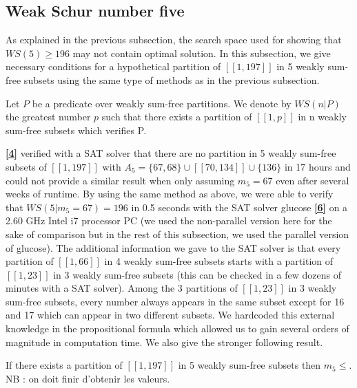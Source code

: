 \subsection{Weak Schur number five}
As explained in the previous subsection, the search space used for showing that \(WS(5) \geqslant 196\) may not contain
optimal solution. In this subsection,
we give necessary conditions for a hypothetical partition of \([\![1,197]\!]\) in 5 weakly sum-free subsets using the
same type of methods as in the
previous subsection.

\begin{notation}
Let \(P\) be a predicate over weakly sum-free partitions. We denote by \(WS(n | P)\) the greatest number \(p\) such that
there exists a partition of
\([\![1,p]\!]\) in n weakly sum-free subsets which verifies P.
\end{notation}

\par
\hyperlink{label4}{\textbf{[4]}} verified with a SAT solver that there are no partition in 5 weakly sum-free subsets of
\([\![1,197]\!]\) with
\(A_5 = \{67, 68\} \cup [\![70,134]\!] \cup \{136\}\) in 17 hours and could not provide a similar result when only
assuming \(m_5 = 67\) even after several
weeks of runtime. By using the same method as above, we were able to verify that \(WS(5 | m_5 = 67) = 196\) in 0.5
seconds with the SAT solver glucose \hyperlink{label6}{\textbf{[6]}}
on a 2.60 GHz Intel i7 processor PC (we used the non-parallel version here for the sake of comparison but in the rest of
this subsection, we used the parallel version of glucose).
The additional information we gave to the SAT solver is that every partition of \([\![1,66]\!]\) in 4 weakly sum-free
subsets starts with a partition of
\([\![1,23]\!]\) in 3 weakly sum-free subsets (this can be checked in a few dozens of minutes with a SAT solver). Among
the 3 partitions of \([\![1,23]\!]\) in
3 weakly sum-free subsets, every number always appears in the same subset except for 16 and 17 which can appear in two
different subsets. We hardcoded
this external knowledge in the propositional formula which allowed us to gain several orders of magnitude in computation
time. We also give the stronger
following result.

\begin{computational theorem}
If there exists a partition of \([\![1,197]\!]\) in 5 weakly sum-free subsets then \(m_5 \leq\). \\
NB : on doit finir d'obtenir les valeurs.
\end{computational theorem}

